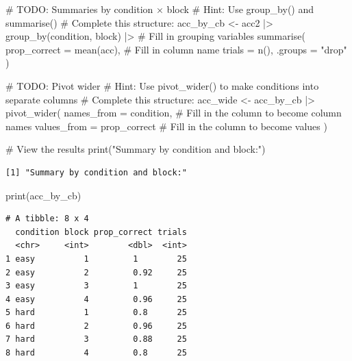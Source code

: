 \documentclass[
  letterpaper,
  DIV=11,
  numbers=noendperiod]{scrartcl}
\newenvironment{Shaded}{\begin{snugshade}}{\end{snugshade}}
\newcommand{\AlertTok}[1]{\textcolor[rgb]{0.68,0.00,0.00}{#1}}
\newcommand{\AttributeTok}[1]{\textcolor[rgb]{0.40,0.45,0.13}{#1}}
\newcommand{\CommentTok}[1]{\textcolor[rgb]{0.37,0.37,0.37}{#1}}
\newcommand{\FunctionTok}[1]{\textcolor[rgb]{0.28,0.35,0.67}{#1}}
\newcommand{\NormalTok}[1]{\textcolor[rgb]{0.00,0.23,0.31}{#1}}
\newcommand{\OtherTok}[1]{\textcolor[rgb]{0.00,0.23,0.31}{#1}}
\newcommand{\SpecialCharTok}[1]{\textcolor[rgb]{0.37,0.37,0.37}{#1}}
\newcommand{\StringTok}[1]{\textcolor[rgb]{0.13,0.47,0.30}{#1}}
\begin{document}
\begin{Shaded}
\begin{Highlighting}[]
\CommentTok{\# }\AlertTok{TODO}\CommentTok{: Summaries by condition × block}
\CommentTok{\# Hint: Use group\_by() and summarise()}
\CommentTok{\# Complete this structure:}
\NormalTok{acc\_by\_cb }\OtherTok{\textless{}{-}}\NormalTok{ acc2 }\SpecialCharTok{|\textgreater{}}
  \FunctionTok{group\_by}\NormalTok{(condition, block) }\SpecialCharTok{|\textgreater{}}  \CommentTok{\# Fill in grouping variables}
  \FunctionTok{summarise}\NormalTok{(}
    \AttributeTok{prop\_correct =} \FunctionTok{mean}\NormalTok{(acc),  }\CommentTok{\# Fill in column name}
    \AttributeTok{trials =} \FunctionTok{n}\NormalTok{(), }
    \AttributeTok{.groups =} \StringTok{"drop"}
\NormalTok{  )}

\CommentTok{\# }\AlertTok{TODO}\CommentTok{: Pivot wider}
\CommentTok{\# Hint: Use pivot\_wider() to make conditions into separate columns}
\CommentTok{\# Complete this structure:}
\NormalTok{acc\_wide }\OtherTok{\textless{}{-}}\NormalTok{ acc\_by\_cb }\SpecialCharTok{|\textgreater{}}
  \FunctionTok{pivot\_wider}\NormalTok{(}
    \AttributeTok{names\_from =}\NormalTok{ condition,     }\CommentTok{\# Fill in the column to become column names}
    \AttributeTok{values\_from =}\NormalTok{ prop\_correct     }\CommentTok{\# Fill in the column to become values}
\NormalTok{  )}

\CommentTok{\# View the results}
\FunctionTok{print}\NormalTok{(}\StringTok{"Summary by condition and block:"}\NormalTok{)}
\end{Highlighting}
\end{Shaded}

\begin{verbatim}
[1] "Summary by condition and block:"
\end{verbatim}

\begin{Shaded}
\begin{Highlighting}[]
\FunctionTok{print}\NormalTok{(acc\_by\_cb)}
\end{Highlighting}
\end{Shaded}

\begin{verbatim}
# A tibble: 8 x 4
  condition block prop_correct trials
  <chr>     <int>        <dbl>  <int>
1 easy          1         1        25
2 easy          2         0.92     25
3 easy          3         1        25
4 easy          4         0.96     25
5 hard          1         0.8      25
6 hard          2         0.96     25
7 hard          3         0.88     25
8 hard          4         0.8      25
\end{verbatim}
\end{document}
